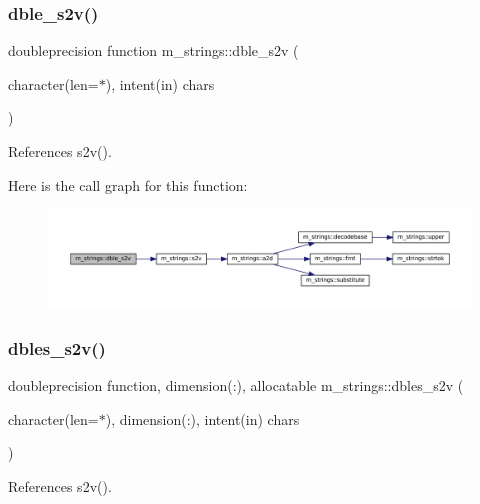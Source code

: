 \subsubsection{\texorpdfstring{dble\+\_\+s2v()}{dble\_s2v()}}
{\footnotesize\ttfamily doubleprecision function m\+\_\+strings\+::dble\+\_\+s2v (\begin{DoxyParamCaption}\item[{character(len=$\ast$), intent(in)}]{chars }\end{DoxyParamCaption})\hspace{0.3cm}{\ttfamily [private]}}



References s2v().

Here is the call graph for this function\+:\nopagebreak
\begin{figure}[H]
\begin{center}
\leavevmode
\includegraphics[width=350pt]{namespacem__strings_a970d99e3a2ab426bb90d6ea90bcc588a_cgraph}
\end{center}
\end{figure}
\mbox{\label{namespacem__strings_ab463f9b431dd817b7b509608ec823b0f}} 
\subsubsection{\texorpdfstring{dbles\+\_\+s2v()}{dbles\_s2v()}}
{\footnotesize\ttfamily doubleprecision function, dimension(\+:), allocatable m\+\_\+strings\+::dbles\+\_\+s2v (\begin{DoxyParamCaption}\item[{character(len=$\ast$), dimension(\+:), intent(in)}]{chars }\end{DoxyParamCaption})\hspace{0.3cm}{\ttfamily [private]}}



References s2v().

